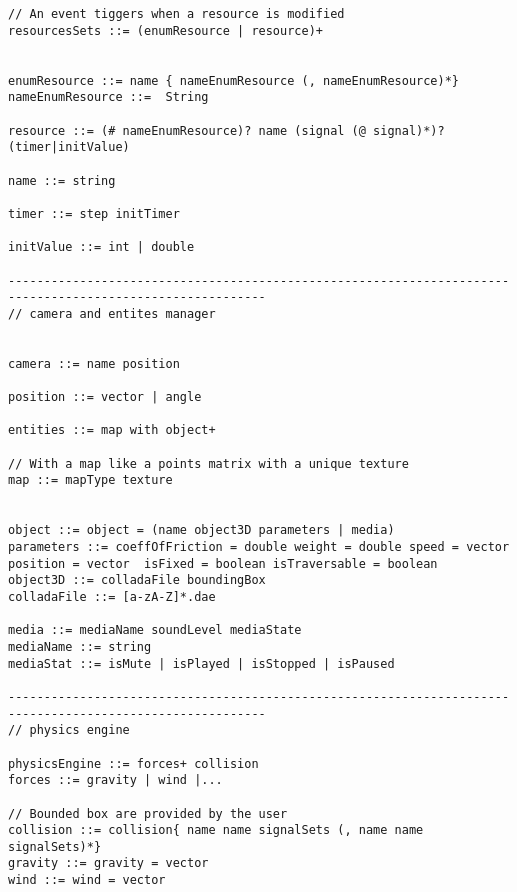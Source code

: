 \begin{lstlisting}[language=Grammar]
// An event tiggers when a resource is modified
resourcesSets ::= (enumResource | resource)+


enumResource ::= name { nameEnumResource (, nameEnumResource)*}
nameEnumResource ::=  String

resource ::= (# nameEnumResource)? name (signal (@ signal)*)? (timer|initValue)

name ::= string

timer ::= step initTimer

initValue ::= int | double

----------------------------------------------------------------------------------------------------------
// camera and entites manager


camera ::= name position

position ::= vector | angle

entities ::= map with object+

// With a map like a points matrix with a unique texture
map ::= mapType texture


object ::= object = (name object3D parameters | media)
parameters ::= coeffOfFriction = double weight = double speed = vector position = vector  isFixed = boolean isTraversable = boolean
object3D ::= colladaFile boundingBox
colladaFile ::= [a-zA-Z]*.dae

media ::= mediaName soundLevel mediaState
mediaName ::= string
mediaStat ::= isMute | isPlayed | isStopped | isPaused

----------------------------------------------------------------------------------------------------------
// physics engine

physicsEngine ::= forces+ collision
forces ::= gravity | wind |...

// Bounded box are provided by the user
collision ::= collision{ name name signalSets (, name name signalSets)*}
gravity ::= gravity = vector
wind ::= wind = vector


\end{lstlisting}
